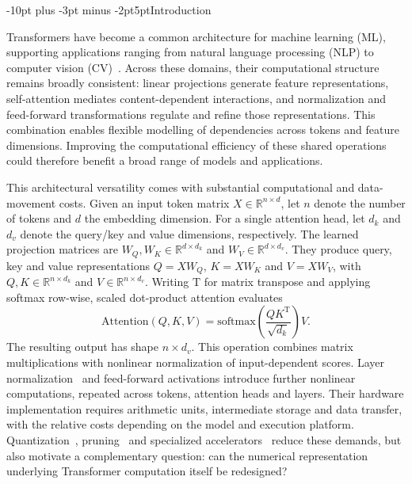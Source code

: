 \documentclass[pdflatex,sn-mathphys-num]{sn-jnl}
\makeatletter
\renewcommand\section{\@startsection{section}{1}{\z@}%
  {-10pt plus -3pt minus -2pt}{5pt}{\sectionfont}}
\theoremstyle{thmstyleone}
\theoremstyle{thmstyletwo}
\theoremstyle{thmstylethree}
\makeatother
\begin{document}


\maketitle

\section{Introduction}
\label{sec:introduction}

Transformers have become a common architecture for machine learning (ML), supporting applications ranging from natural language processing (NLP) to computer vision (CV)~\cite{vaswani2017attention,dosovitskiy2021image}. Across these domains, their computational structure remains broadly consistent: linear projections generate feature representations, self-attention mediates content-dependent interactions, and normalization and feed-forward transformations regulate and refine those representations. This combination enables flexible modelling of dependencies across tokens and feature dimensions. Improving the computational efficiency of these shared operations could therefore benefit a broad range of models and applications.

This architectural versatility comes with substantial computational and data-movement costs. Given an input token matrix $X\in\mathbb{R}^{n\times d}$, let $n$ denote the number of tokens and $d$ the embedding dimension. For a single attention head, let $d_k$ and $d_v$ denote the query/key and value dimensions, respectively. The learned projection matrices are $W_Q,W_K\in\mathbb{R}^{d\times d_k}$ and $W_V\in\mathbb{R}^{d\times d_v}$. They produce query, key and value representations $Q=XW_Q$, $K=XW_K$ and $V=XW_V$, with $Q,K\in\mathbb{R}^{n\times d_k}$ and $V\in\mathbb{R}^{n\times d_v}$. Writing $\mathrm{T}$ for matrix transpose and applying softmax row-wise, scaled dot-product attention evaluates~\cite{vaswani2017attention}
\begin{equation}
\mathrm{Attention}(Q,K,V) = \mathrm{softmax} \left( \frac{QK^{\mathrm T}}{\sqrt{d_k}} \right)V. \label{eq:standard_attention}
\end{equation}
The resulting output has shape $n\times d_v$. This operation combines matrix multiplications with nonlinear normalization of input-dependent scores. Layer normalization~\cite{ba2016layer} and feed-forward activations introduce further nonlinear computations, repeated across tokens, attention heads and layers. Their hardware implementation requires arithmetic units, intermediate storage and data transfer, with the relative costs depending on the model and execution platform. Quantization~\cite{kim2021ibert}, pruning~\cite{wang2021spatten} and specialized accelerators~\cite{li2020ftrans} reduce these demands, but also motivate a complementary question: can the numerical representation underlying Transformer computation itself be redesigned?
\end{document}
